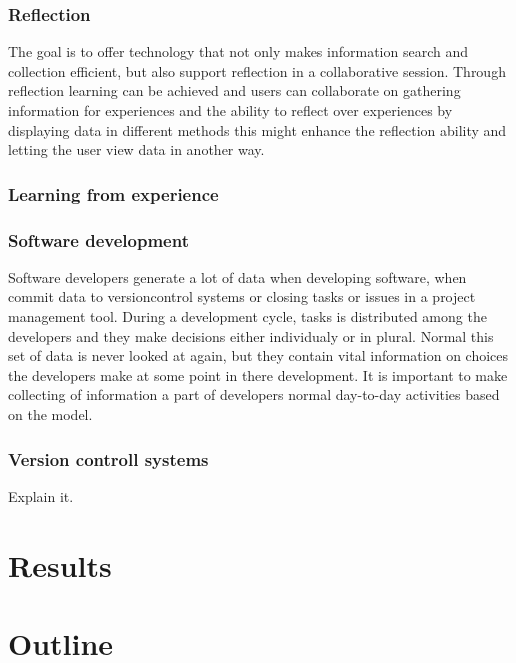 \subsubsection{Reflection}
The goal is to offer technology that not only makes information search and collection efficient, but also support reflection in a collaborative session. Through reflection learning can be achieved and users can collaborate on gathering information for experiences and the ability to reflect over experiences by displaying data in different methods this might enhance the reflection ability and letting the user view data in another way.

\subsubsection{Learning from experience}

\subsubsection{Software development}
Software developers generate a lot of data when developing software, when commit data to versioncontrol systems or closing tasks or issues in a project management tool. During a development cycle, tasks is distributed among the developers and they make decisions either individualy or in plural. Normal this set of data is never looked at again, but they contain vital information on choices the developers make at some point in there development. It is important to make collecting of information a part of developers normal day-to-day activities based on the model\cite{Krogstie2009}.

\subsubsection{Version controll systems}
Explain it.



\section{Results}
\section{Outline}